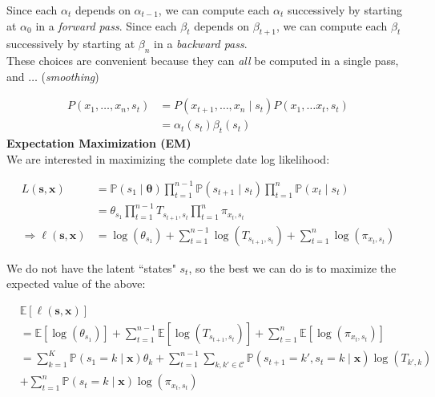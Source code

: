 \documentclass[10pt,landscape]{article}
\newcommand{\p}{\mathbb{P}}
\newcommand{\E}{\mathbb{E}}
\begin{document}
\begin{multicols*}{3}
	Since each $\alpha_{t}$ depends on $\alpha_{t - 1}$, we can compute each $\alpha_{t}$ successively by starting at $\alpha_{0}$ in a \textit{forward pass}.
	Since each $\beta_{t}$ depends on $\beta_{t + 1}$, we can compute each $\beta_{t}$ successively by starting at $\beta_{n}$ in a \textit{backward pass}.\\
	\smallskip
	These choices are convenient because they can \textit{all} be computed in a single pass, and $\dots$ (\textit{smoothing})

	\begin{equation*}\begin{aligned}
			P(x_{1}, \dots, x_{n}, s_{t}) & = P(x_{t + 1}, \dots, x_{n} \mid s_{t}) P(x_{1}, \dots x_{t}, s_{t}) \\
			                              & = \alpha_{t}(s_{t})\beta_{t}(s_{t})
		\end{aligned}\end{equation*}
	\textbf{Expectation Maximization (EM)}\\

	We are interested in maximizing the complete date log likelihood:

	\begin{equation*}\begin{aligned}
			L(\mathbf{s}, \mathbf{x})                & = \p(s_{1} \mid \pmb{\theta}) \prod_{t = 1}^{n - 1} \p(s_{t + 1} \mid s_{t}) \prod_{t = 1}^{n} \p(x_{t} \mid s_{t})  \\
			                                         & = \theta_{s_{1}} \prod_{t = 1}^{n - 1}T_{s_{t + 1}, s_{t}} \prod_{t = 1}^{n} \pi_{x_{t}, s_{t}}                      \\
			\Rightarrow \ell(\mathbf{s}, \mathbf{x}) & = \log(\theta_{s_{1}}) + \sum_{t = 1}^{n - 1} \log(T_{s_{t + 1}, s_{t}}) + \sum_{t = 1}^{n} \log(\pi_{x_{t}, s_{t}})
		\end{aligned}\end{equation*}

	We do not have the latent ``states" $s_{t}$, so the best we can do is to maximize the expected value of the above:

	\begin{equation*}\begin{aligned}
			 & \E[\ell(\mathbf{s}, \mathbf{x})]                                                                                                                                              \\ &= \E[\log(\theta_{s_{1}})] + \sum_{t = 1}^{n - 1} \E[\log(T_{s_{t + 1}, s_{t}})] + \sum_{t = 1}^{n} \E[\log(\pi_{x_{t}, s_{t}})]\\
			 & = \sum_{k = 1}^{K} \p(s_{1} = k \mid \mathbf{x}) \theta_{k} + \sum_{t = 1}^{n - 1} \sum_{k, k' \in \mathcal{C}} \p(s_{t + 1} = k', s_{t} = k \mid \mathbf{x}) \log(T_{k', k}) \\
			 & + \sum_{t = 1}^{n} \p(s_{t} = k \mid \mathbf{x}) \log(\pi_{x_{t}, s_{t}})                                                                                                     \\
		\end{aligned}\end{equation*}


\end{multicols*}
\end{document}
